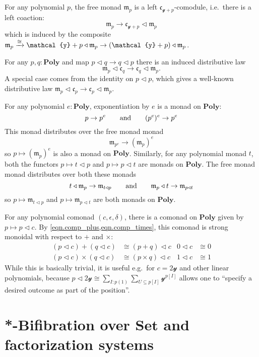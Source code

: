 \documentclass[11pt, one side, article]{memoir}
\theoremstyle{definition}
\theoremstyle{plain}
\renewcommand{\ss}{\subseteq}
\newcommand{\Cat}[1]{\mathbf{#1}}%
\newcommand{\To}[2][]{\xrightarrow[#1]{\tn{$#2$}}}
\newcommand{\tn}[1]{\textnormal{#1}}
\newcommand{\smset}{\Cat{Set}}
\newcommand{\yon}{{\mathcal{y}}}
\newcommand{\poly}{\Cat{Poly}}
\newcommand{\0}{\textsf{0}}
\newcommand{\1}{\tn{\textsf{1}}}
\newcommand{\tri}{\mathbin{\triangleleft}}
\newcommand{\cofree}{\mathfrak{c}}
\newcommand{\free}{\mathfrak{m}}
\newcommand{\hh}[2][]{#1 \tn{#2} #1}
\newcommand{\qqand}{\hh[\qquad]{and}}
\begin{document}
For any polynomial $p$, the free monad $\free_p$ is a left $\cofree_{\yon+p}$-comodule, i.e.\ there is a left coaction:
\begin{equation}
	\free_p\to\cofree_{\yon+p}\tri\free_p
\end{equation}
which is induced by the composite $\free_p\To{\cong}\yon+p\tri\free_p\to(\yon+p)\tri\free_p$. 

For any $p,q:\poly$ and map $p\tri q\to q\tri p$ there is an induced distributive law
\begin{equation}
  \free_p\tri\cofree_q\to\cofree_q\tri\free_p.
\end{equation}
A special case comes from the identity on $p\tri p$, which gives a well-known distributive law $\free_p\tri\cofree_p\to\cofree_p\tri\free_p$.

For any polynomial $e:\poly$, exponentiation by $e$ is a monad on $\poly$:
\begin{equation}
	p\to p^e
	\qqand
	(p^e)^e\to p^e
\end{equation}
This monad distributes over the free monad monad
\begin{equation}
	\free_{p^e}\to(\free_p)^e
\end{equation}
so $p\mapsto(\free_p)^e$ is also a monad on $\poly$. Similarly, for any polynomial monad $t$, both the functors $p\mapsto t\tri p$ and $p\mapsto p\tri t$ are monads on $\poly$. The free monad monad distributes over both these monads
\begin{equation}
	t\tri\free_p\to\free_{t\tri p}
	\qqand
	\free_p\tri t\to\free_{p\tri t}
\end{equation}
so $p\mapsto \free_{t\tri p}$ and $p\mapsto \free_{p\tri t}$ are both monads on $\poly$.


For any polynomial comonad $(c,\epsilon,\delta)$, there is a comonad on $\poly$ given by $p\mapsto p\tri c$. By \cref{eqn.comp_plus,eqn.comp_times}, this comonad is strong monoidal with respect to $+$ and $\times$:
\begin{align}
	(p\tri c)+(q\tri c)&\cong (p+q)\tri c&0\tri c&\cong0\\
	(p\tri c)\times(q\tri c)&\cong (p\times q)\tri c&1\tri c&\cong1	
\end{align}
While this is basically trivial, it is useful e.g.\ for $c=2\yon$ and other linear polynomials, because $p\tri 2\yon\cong\sum_{I:p(1)}\sum_{U\ss p[I]}\yon^{p[I]}$ allows one to ``specify a desired outcome as part of the position''.

\chapter{*-Bifibration over $\smset$ and factorization systems}\label{chap.bifib}
\end{document}
